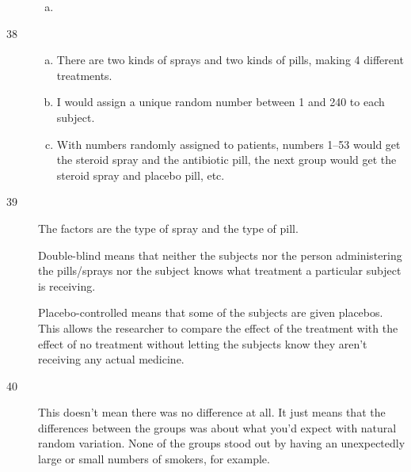 \documentclass[letterpaper]{exam}
\begin{document}
\begin{description}
\begin{enumerate}[(a)]
          \item 
        \end{enumerate}

      \item[38]
        \begin{enumerate}[(a)]
          \item There are two kinds of sprays and two kinds of pills, making 4
            different treatments.  

          \item I would assign a unique random number between 1 and 240 to each
            subject.

          \item With numbers randomly assigned to patients, numbers 1--53 would
            get the steroid spray and the antibiotic pill, the next group would
            get the steroid spray and placebo pill, etc.
        \end{enumerate}

      \item[39]
        The factors are the type of spray and the type of pill.

        Double-blind means that neither the subjects nor the person
        administering the pills/sprays nor the subject knows what treatment a
        particular subject is receiving.

        Placebo-controlled means that some of the subjects are given placebos.
        This allows the researcher to compare the effect of the treatment with
        the effect of no treatment without letting the subjects know they
        aren't receiving any actual medicine.

      \item[40] This doesn't mean there was no difference at all.  It just means
        that the differences between the groups was about what you'd expect with
        natural random variation.  None of the groups stood out by having an
        unexpectedly large or small numbers of smokers, for example.


\end{description}
\end{document}
